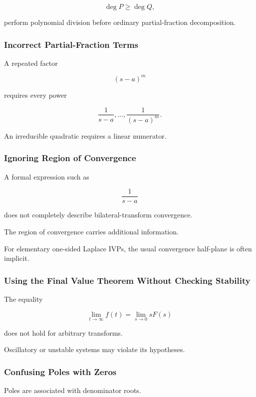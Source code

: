 \[
\deg P
\geq
\deg Q,
\]

perform polynomial division before ordinary partial-fraction
decomposition.

\subsubsection{Incorrect Partial-Fraction Terms}

A repeated factor

\[
(s-a)^m
\]

requires every power

\[
\frac1{s-a},
\ldots,
\frac1{(s-a)^m}.
\]

An irreducible quadratic requires a linear numerator.

\subsubsection{Ignoring Region of Convergence}

A formal expression such as

\[
\frac1{s-a}
\]

does not completely describe bilateral-transform convergence.

The region of convergence carries additional information.

For elementary one-sided Laplace IVPs, the usual convergence half-plane is
often implicit.

\subsubsection{Using the Final Value Theorem Without Checking Stability}

The equality

\[
\lim_{t\to\infty}f(t)
=
\lim_{s\to0}sF(s)
\]

does not hold for arbitrary transforms.

Oscillatory or unstable systems may violate its hypotheses.

\subsubsection{Confusing Poles with Zeros}

Poles are associated with denominator roots.

